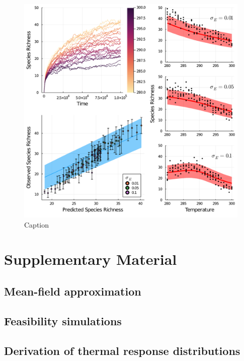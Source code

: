 \documentclass{article}
\begin{document}
\begin{figure}
    \centering
    \includegraphics[width = \textwidth]{docs/Figures/Fig_4.pdf}
    \caption{Caption}
    \label{Fig:Temperature_assembly}
\end{figure}

\section{Supplementary Material}

\subsection{Mean-field approximation} \label{SI_Sec:Meanfield}

\subsection{Feasibility simulations} \label{SI_Sec:Feas_sims}

\subsection{Derivation of thermal response distributions} \label{SI_Sec:TPC_dist}
\end{document}
